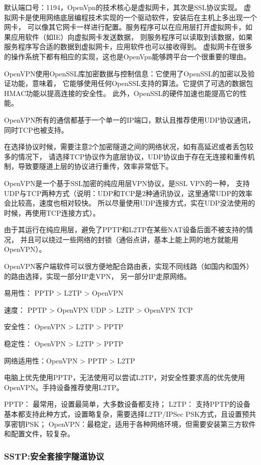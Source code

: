 \documentclass{book}
\begin{document}
默认端口号：1194，OpenVpn的技术核心是虚拟网卡，其次是SSL协议实现。
虚拟网卡是使用网络底层编程技术实现的一个驱动软件，安装后在主机上多出现一个网卡，
可以像其它网卡一样进行配置。服务程序可以在应用层打开虚拟网卡，如果应用软件（如IE）向虚拟网卡发送数据，
则服务程序可以读取到该数据，如果服务程序写合适的数据到虚拟网卡，应用软件也可以接收得到。
虚拟网卡在很多的操作系统下都有相应的实现，这也是OpenVpn能够跨平台一个很重要的理由。

OpenVPN使用OpenSSL库加密数据与控制信息：它使用了OpenSSL的加密以及验证功能，意味着，
它能够使用任何OpenSSL支持的算法。它提供了可选的数据包HMAC功能以提高连接的安全性。
此外，OpenSSL的硬件加速也能提高它的性能。

OpenVPN所有的通信都基于一个单一的IP端口，默认且推荐使用UDP协议通讯，同时TCP也被支持。

在选择协议时候，需要注意2个加密隧道之间的网络状况，如有高延迟或者丢包较多的情况下，
请选择TCP协议作为底层协议，UDP协议由于存在无连接和重传机制，导致要隧道上层的协议进行重传，效率非常低下。

OpenVPN是一个基于SSL加密的纯应用层VPN协议，是SSL VPN的一种，
支持UDP与TCP两种方式（说明：UDP和TCP是2种通讯协议，这里通常UDP的效率会比较高，速度也相对较快。
所以尽量使用UDP连接方式，实在UDP没法使用的时候，再使用TCP连接方式）。

由于其运行在纯应用层，避免了PPTP和L2TP在某些NAT设备后面不被支持的情况，
并且可以绕过一些网络的封锁（通俗点讲，基本上能上网的地方就能用OpenVPN）。

OpenVPN客户端软件可以很方便地配合路由表，实现不同线路（如国内和国外）的路由选择，实现一部分IP走VPN，
另一部分IP走原网络。


易用性：    PPTP > L2TP > OpenVPN

速度：      PPTP > OpenVPN UDP > L2TP > OpenVPN TCP

安全性：    OpenVPN > L2TP > PPTP

稳定性：    OpenVPN > L2TP > PPTP

网络适用性：OpenVPN > PPTP > L2TP

电脑上优先使用PPTP，无法使用可以尝试L2TP，对安全性要求高的优先使用OpenVPN。手持设备推荐使用L2TP。

PPTP：      最常用，设置最简单，大多数设备都支持；
L2TP：      支持PPTP的设备基本都支持此种方式，设置略复杂，需要选择L2TP/IPSec PSK方式，且设置预共享密钥PSK；
OpenVPN：最稳定，适用于各种网络环境，但需要安装第三方软件和配置文件，较复杂。

\subsubsection{SSTP:安全套接字隧道协议}
\end{document}
